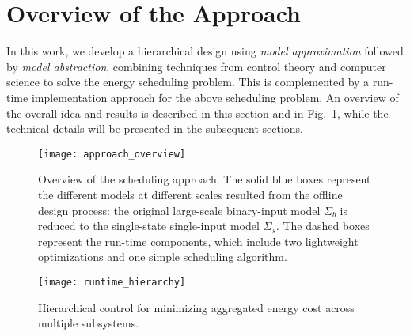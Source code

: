 \section{Overview of the Approach}
\label{sec:overview}

In this work, we develop a hierarchical design using \emph{model approximation} followed by \emph{model abstraction}, combining techniques from control theory and computer science to solve the energy scheduling problem. %
This is complemented by a run-time implementation approach for the above scheduling problem. %
An overview of the overall idea and results is described in this section and in Fig.~\ref{fig:overview}, while the technical details will be presented in the subsequent sections.

\begin{figure}[tb]
  \centering
  \texttt{[image: approach\_overview]}
  \vspace{-16pt}
  \caption{Overview of the scheduling approach. The solid blue boxes represent the different models at different scales resulted from the offline design process: the original large-scale binary-input model $\Sigma_{b}$ is reduced to the single-state single-input model $\Sigma_{s}$.  The dashed boxes represent the run-time components, which include two lightweight optimizations and one simple scheduling algorithm.}
  \vspace{-6pt}
  \label{fig:overview}
\end{figure}

\begin{figure}[tb]
  \centering
  \texttt{[image: runtime\_hierarchy]}
  \vspace{-16pt}
  \caption{Hierarchical control for minimizing aggregated energy cost across multiple subsystems.}%
  \vspace{-12pt}
  \label{fig:runtime-hierarchy}
\end{figure}

